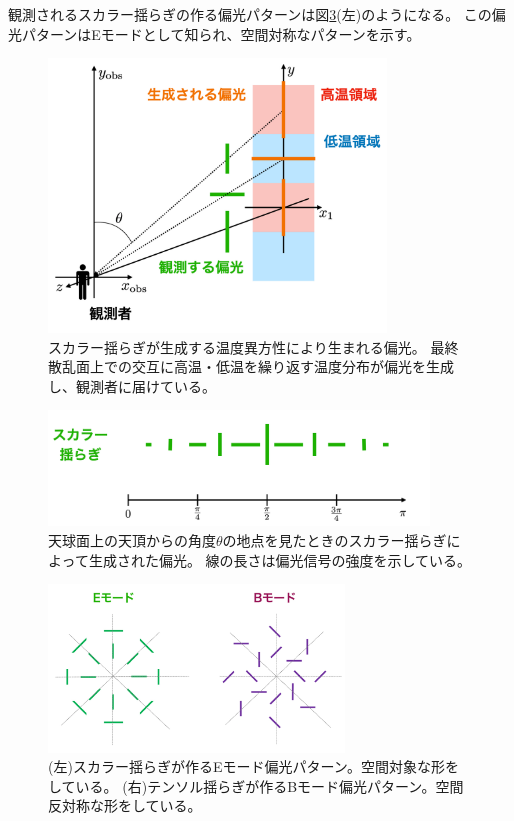 \documentclass[../../main.tex]{subfiles}
\begin{document}
観測されるスカラー揺らぎの作る偏光パターンは図\ref{fig:Emode_Bmode}(左)のようになる。
この偏光パターンはEモードとして知られ、空間対称なパターンを示す。

\begin{figure}[H]
    \centering
    \includegraphics[width=0.8\textwidth]{intro/scalar_polarization.pdf}
    \caption{スカラー揺らぎが生成する温度異方性により生まれる偏光。
    最終散乱面上での交互に高温・低温を繰り返す温度分布が偏光を生成し、観測者に届けている。}
    \label{fig:scalar_polarization}
\end{figure}
\begin{figure}[H]
    \centering
    \includegraphics[width=0.9\textwidth]{intro/scalar_pol_theta.pdf}
    \caption{天球面上の天頂からの角度$\theta$の地点を見たときのスカラー揺らぎによって生成された偏光。
    線の長さは偏光信号の強度を示している。}
    \label{fig:scalar_pol_theta}
\end{figure}
\begin{figure}[H]
    \centering
    \includegraphics[width=0.7\textwidth]{intro/Emode_Bmode.pdf}
    \caption{(左)スカラー揺らぎが作るEモード偏光パターン。空間対象な形をしている。
    (右)テンソル揺らぎが作るBモード偏光パターン。空間反対称な形をしている。}
    \label{fig:Emode_Bmode}
\end{figure}
\end{document}
